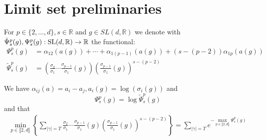 \documentclass{report}
\begin{document}
\section{Limit set preliminaries}
\begin{definition}
For $p \in \{2, \ldots, d\}, s\in \mathbb R $
and $g \in SL(d, \mathbb R)$ 
we denote with $\tilde \Psi_s^p(g), \Psi_s^p(g): \operatorname{{\mathrm{SL}}}(d, \mathbb R) \to \mathbb R$ the functional:
\begin{align*}
\Psi_s^p(g) &= 
    \alpha_{12}(a(g)) + \cdots + \alpha_{1(p-1)}(a(g)) + (s - (p-2))\alpha_{1p}(a(g))\\
\tilde \Psi_s^p(g) &= 
    \left( \frac{\sigma_2}{\sigma_1}\cdots\frac{\sigma_{p-1}}{\sigma_1}(g)\right) 
    \left( \frac{\sigma_{p-1}}{\sigma_1}(g) \right)^{s - (p-2)}
\end{align*}
\end{definition}
\begin{remark}
    We have $\alpha_{ij}(a) = a_i - a_j, a_i(g) = \log (\sigma_i(g))$ and 
    \[
        \Psi_s^p(g) = \log \tilde \Psi_s^p(g)
    \]
and that
\begin{align*}
    \min_{p \in \llbracket 2, d \rrbracket} 
    \left\{ 
        \sum_{|\gamma| = T} 
            \frac{\sigma_2}{\sigma_1}\cdots\frac{\sigma_{p-1}}{\sigma_1}(g) 
            \left( \frac{\sigma_{p-1}}{\sigma_1}(g) \right)^{s - (p-2)}
    \right\} = 
    \sum_{|\gamma| = T} e^{-\max\limits_{p \in \llbracket 2, d \rrbracket} \Psi_s^p(g)}
\end{align*}
\end{remark}
\end{document}
